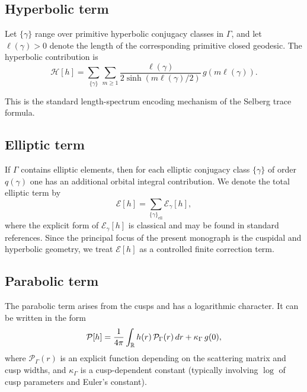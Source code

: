 \subsection{Hyperbolic term}
\label{subsec:H.hyperbolic}

Let $\{\gamma\}$ range over primitive hyperbolic conjugacy classes in $\Gamma$, and let $\ell(\gamma)>0$ denote the
length of the corresponding primitive closed geodesic.
The hyperbolic contribution is
\begin{equation}\label{eq:H.hyperbolic}
\mathcal{H}[h]
=
\sum_{\{\gamma\}}
\sum_{m\ge 1}
\frac{\ell(\gamma)}{2\sinh(m\ell(\gamma)/2)}\,g(m\ell(\gamma)).
\end{equation}

This is the standard length-spectrum encoding mechanism of the Selberg trace formula.

\subsection{Elliptic term}
\label{subsec:H.elliptic}

If $\Gamma$ contains elliptic elements, then for each elliptic conjugacy class $\{\gamma\}$ of order $q(\gamma)$ one
has an additional orbital integral contribution.  We denote the total elliptic term by
\begin{equation}\label{eq:H.elliptic}
\mathcal{E}[h]
=
\sum_{\{\gamma\}_{\mathrm{ell}}}
\mathcal{E}_\gamma[h],
\end{equation}
where the explicit form of $\mathcal{E}_\gamma[h]$ is classical and may be found in standard references.
Since the principal focus of the present monograph is the cuspidal and hyperbolic geometry, we treat $\mathcal{E}[h]$
as a controlled finite correction term.

\subsection{Parabolic term}
\label{subsec:H.parabolic}

The parabolic term arises from the cusps and has a logarithmic character.
It can be written in the form
\begin{equation}\label{eq:H.parabolic}
\mathcal{P}[h]
=
\frac{1}{4\pi}\int_{\mathbb{R}} h(r)\,\mathcal{P}_\Gamma(r)\,dr
+
\kappa_\Gamma\,g(0),
\end{equation}
where $\mathcal{P}_\Gamma(r)$ is an explicit function depending on the scattering matrix and cusp widths, and
$\kappa_\Gamma$ is a cusp-dependent constant (typically involving $\log$ of cusp parameters and Euler's constant).

